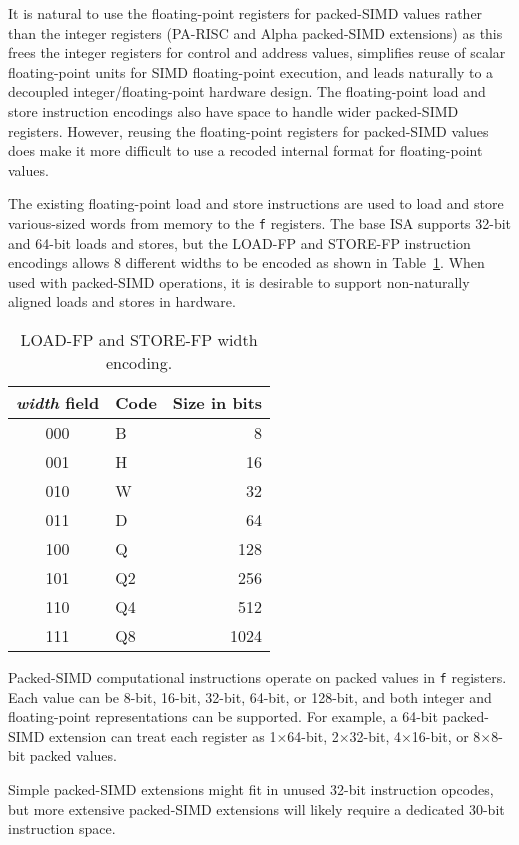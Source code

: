 \begin{commentary}
It is natural to use the floating-point registers for packed-SIMD
values rather than the integer registers (PA-RISC and Alpha
packed-SIMD extensions) as this frees the integer registers for
control and address values, simplifies reuse of scalar floating-point
units for SIMD floating-point execution, and leads naturally to a
decoupled integer/floating-point hardware design.  The floating-point
load and store instruction encodings also have space to handle wider
packed-SIMD registers.  However, reusing the floating-point registers
for packed-SIMD values does make it more difficult to use a recoded
internal format for floating-point values.
\end{commentary}

The existing floating-point load and store instructions are used to
load and store various-sized words from memory to the {\tt f}
registers.  The base ISA supports 32-bit and 64-bit loads and stores,
but the LOAD-FP and STORE-FP instruction encodings allows 8 different
widths to be encoded as shown in Table~\ref{psimdwidth}.  When used
with packed-SIMD operations, it is desirable to support non-naturally
aligned loads and stores in hardware.

\begin{table}[htp]
\begin{center}
\begin{tabular}{|c|l|r|}
\hline
{\em width} field &
Code &
Size in bits\\
\hline
000 & B  &  8   \\
001 & H  & 16   \\
010 & W  & 32   \\
011 & D  & 64   \\
100 & Q  & 128  \\
101 & Q2 & 256  \\
110 & Q4 & 512  \\
111 & Q8 & 1024 \\
\hline
\end{tabular}
\end{center}
\caption{LOAD-FP and STORE-FP width encoding.}
\label{psimdwidth}
\end{table}

Packed-SIMD computational instructions operate on packed values in
{\tt f} registers.  Each value can be 8-bit, 16-bit, 32-bit, 64-bit,
or 128-bit, and both integer and floating-point representations can be
supported.  For example, a 64-bit packed-SIMD extension can treat each
register as 1$\times$64-bit, 2$\times$32-bit, 4$\times$16-bit, or
8$\times$8-bit packed values.

\begin{commentary}
Simple packed-SIMD extensions might fit in unused 32-bit instruction
opcodes, but more extensive packed-SIMD extensions will likely require
a dedicated 30-bit instruction space.
\end{commentary}
